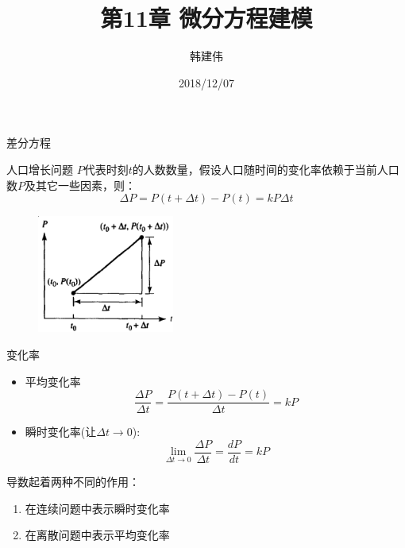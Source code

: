 \documentclass[UTF8]{ctexbeamer}
\title{第11章 微分方程建模}
\author{韩建伟}
\institute{
  信息学院\\
  \texttt{hanjianwei@zjgsu.edu.cn}
}
\date{2018/12/07}
\begin{document}
\begin{frame}[plain]
  \titlepage{}
\end{frame}

\begin{frame}{差分方程}
  
  \begin{block}{人口增长问题}
    $P$代表时刻$t$的人数数量，假设人口随时间的变化率依赖于当前人口数$P$及其它一些因素，则：
    \[
    \Delta P = P(t+\Delta t) - P(t) = kP\Delta t
    \]
  \end{block}

  \begin{figure}
    \centering
    \includegraphics[width=0.4\textwidth]{diff.png}
  \end{figure}
  
\end{frame}

\begin{frame}{变化率}
  \begin{itemize}
  \item 平均变化率
    \[
    \frac{\Delta P}{\Delta t} = \frac{P(t+\Delta t) - P(t)}{\Delta t} = kP
    \]
  \item 瞬时变化率(让$\Delta t \rightarrow 0$):
    \[
    \lim_{\Delta t \rightarrow 0} \frac{\Delta P}{\Delta t} =\frac{d P}{d t} =kP
    \]
  \end{itemize}

  导数起着两种不同的作用：

  \begin{enumerate}
  \item 在连续问题中表示瞬时变化率
  \item 在离散问题中表示平均变化率
  \end{enumerate}

\end{frame}
\end{document}
